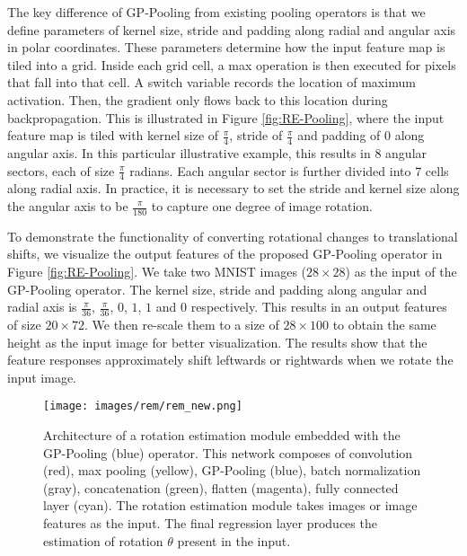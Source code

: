 \documentclass[10pt,twocolumn,letterpaper]{article}
\begin{document}
The key difference of GP-Pooling from existing pooling operators is that we define parameters of kernel size, stride and padding along radial and angular axis in polar coordinates. These parameters determine how the input feature map is tiled into a grid. Inside each grid cell, a max operation is then executed for pixels that fall into that cell. A switch variable records the location of maximum activation. Then, the gradient only flows back to this location during backpropagation. This is illustrated in Figure \ref{fig:RE-Pooling}, where the input feature map is tiled with kernel size of $\frac{\pi}{4}$, stride of $\frac{\pi}{4}$ and padding of $0$ along angular axis. In this particular illustrative example, this results in 8 angular sectors, each of size $\frac{\pi}{4}$ radians. Each angular sector is further divided into 7 cells along radial axis. In practice, it is necessary to set the stride and kernel size along the angular axis to be $\frac{\pi}{180}$ to capture one degree of image rotation.

To demonstrate the functionality of converting rotational changes to translational shifts, we visualize the output features of the proposed GP-Pooling operator in Figure \ref{fig:RE-Pooling}. We take two MNIST images ($28 \times 28$) as the input of the GP-Pooling operator. The kernel size, stride and padding along angular and radial axis is $\frac{\pi}{36}$, $\frac{\pi}{36}$, $0$, $1$, $1$ and $0$ respectively. This results in an output features of size $20 \times 72$. We then re-scale them to a size of $28 \times 100$ to obtain the same height as the input image for better visualization. The results show that the feature responses approximately shift leftwards or rightwards when we rotate the input image.


\begin{figure*}[!t]
    \centering
    \texttt{[image: images/rem/rem\_new.png]}
    \caption{Architecture of a rotation estimation module embedded with the GP-Pooling (blue) operator. This network composes of convolution (red), max pooling (yellow), GP-Pooling (blue), batch normalization (gray), concatenation (green), flatten (magenta), fully connected layer (cyan). The rotation estimation module takes images or image features as the input. The final regression layer produces the estimation of rotation $\theta$ present in the input.}
    \label{fig:rotation_estimation}
    \vspace{-0.3cm}
\end{figure*}
\end{document}
